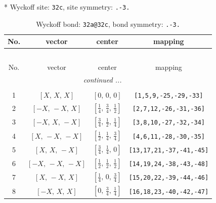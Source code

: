\documentclass[fleqn,8pt]{jsarticle}
\begin{document}
* Wyckoff site: {\tt 32c}, site symmetry: {\tt .-3.}
\renewcommand{\arraystretch}{1.2}
\begin{longtable}{cccc}
\caption{Wyckoff bond: {\tt 32a@32c}, bond symmetry: {\tt .-3.}}
 \\
 \hline \hline
No. & vector & center & mapping \\ \hline \endfirsthead

\multicolumn{3}{l}{\tablename\ \thetable{}} \\
 \hline \hline
No. & vector & center & mapping \\ \hline \endhead

 \hline \hline
\multicolumn{3}{r}{\footnotesize\it continued ...} \\ \endfoot

 \hline \hline
\multicolumn{3}{r}{} \\ \endlastfoot

1 & $\left[ X,\, X,\, X \right]$ & $\left[ 0,\, 0,\, 0 \right]$ & {\tt [1,5,9,-25,-29,-33]} \\ \hline
2 & $\left[ - X,\, - X,\, X \right]$ & $\left[ \frac{1}{4},\, \frac{3}{4},\, \frac{1}{2} \right]$ & {\tt [2,7,12,-26,-31,-36]} \\ \hline
3 & $\left[ - X,\, X,\, - X \right]$ & $\left[ \frac{3}{4},\, \frac{1}{2},\, \frac{1}{4} \right]$ & {\tt [3,8,10,-27,-32,-34]} \\ \hline
4 & $\left[ X,\, - X,\, - X \right]$ & $\left[ \frac{1}{2},\, \frac{1}{4},\, \frac{3}{4} \right]$ & {\tt [4,6,11,-28,-30,-35]} \\ \hline
5 & $\left[ X,\, X,\, - X \right]$ & $\left[ \frac{3}{4},\, \frac{1}{4},\, 0 \right]$ & {\tt [13,17,21,-37,-41,-45]} \\ \hline
6 & $\left[ - X,\, - X,\, - X \right]$ & $\left[ \frac{1}{2},\, \frac{1}{2},\, \frac{1}{2} \right]$ & {\tt [14,19,24,-38,-43,-48]} \\ \hline
7 & $\left[ X,\, - X,\, X \right]$ & $\left[ \frac{1}{4},\, 0,\, \frac{3}{4} \right]$ & {\tt [15,20,22,-39,-44,-46]} \\ \hline
8 & $\left[ - X,\, X,\, X \right]$ & $\left[ 0,\, \frac{3}{4},\, \frac{1}{4} \right]$ & {\tt [16,18,23,-40,-42,-47]} \\
\end{longtable}
\renewcommand{\arraystretch}{1.2}
\end{document}
